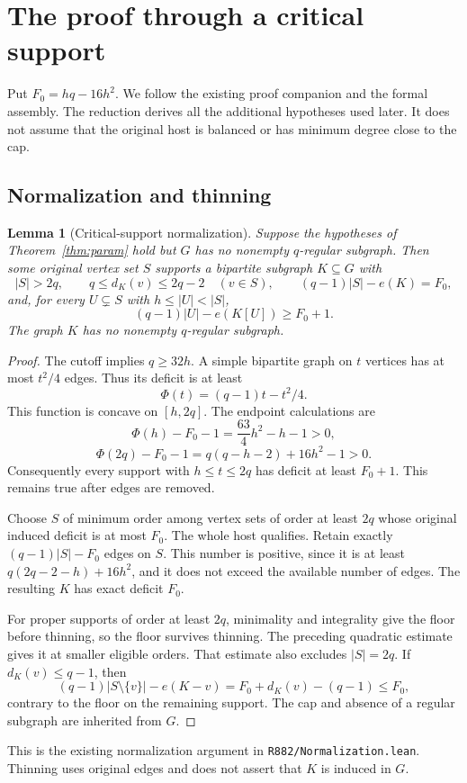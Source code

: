 \documentclass[11pt]{article}
\newtheorem{lemma}[theorem]{Lemma}
\begin{document}
\section{The proof through a critical support}\label{sec:proof}
Put $F_0=hq-16h^2$. We follow the existing proof companion and the formal assembly. The reduction derives all the additional hypotheses used later. It does not assume that the original host is balanced or has minimum degree close to the cap.

\subsection{Normalization and thinning}
\begin{lemma}[Critical-support normalization]\label{lem:critical}
Suppose the hypotheses of Theorem~\ref{thm:param} hold but $G$ has no nonempty $q$-regular subgraph. Then some original vertex set $S$ supports a bipartite subgraph $K\subseteq G$ with
\[
 |S|>2q,\qquad q\le d_K(v)\le2q-2\quad(v\in S),\qquad
 (q-1)|S|-e(K)=F_0,
\]
and, for every $U\subsetneq S$ with $h\le|U|<|S|$,
\begin{equation}\label{eq:floor}
 (q-1)|U|-e(K[U])\ge F_0+1.
\end{equation}
The graph $K$ has no nonempty $q$-regular subgraph.
\end{lemma}
\begin{proof}
The cutoff implies $q\ge32h$. A simple bipartite graph on $t$ vertices has at most $t^2/4$ edges. Thus its deficit is at least
\[
 \Phi(t)=(q-1)t-t^2/4.
\]
This function is concave on $[h,2q]$. The endpoint calculations are
\[
 \Phi(h)-F_0-1=\frac{63}{4}h^2-h-1>0,
\]
\[
 \Phi(2q)-F_0-1=q(q-h-2)+16h^2-1>0.
\]
Consequently every support with $h\le t\le2q$ has deficit at least $F_0+1$. This remains true after edges are removed.

Choose $S$ of minimum order among vertex sets of order at least $2q$ whose original induced deficit is at most $F_0$. The whole host qualifies. Retain exactly $(q-1)|S|-F_0$ edges on $S$. This number is positive, since it is at least $q(2q-2-h)+16h^2$, and it does not exceed the available number of edges. The resulting $K$ has exact deficit $F_0$.

For proper supports of order at least $2q$, minimality and integrality give the floor before thinning, so the floor survives thinning. The preceding quadratic estimate gives it at smaller eligible orders. That estimate also excludes $|S|=2q$. If $d_K(v)\le q-1$, then
\[
 (q-1)|S\setminus\{v\}|-e(K-v)=F_0+d_K(v)-(q-1)\le F_0,
\]
contrary to the floor on the remaining support. The cap and absence of a regular subgraph are inherited from $G$.
\end{proof}
This is the existing normalization argument in \nolinkurl{R882/Normalization.lean}. Thinning uses original edges and does not assert that $K$ is induced in $G$.
\end{document}
